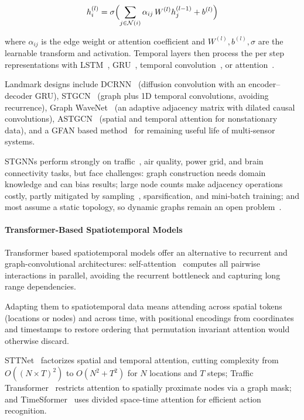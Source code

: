 \documentclass[journal]{IEEEtran}
\begin{document}
\begin{equation}
h_i^{(l)} = \sigma \Bigl( \sum_{j \in \mathcal{N}(i)} \alpha_{ij} \, W^{(l)} h_j^{(l-1)} + b^{(l)} \Bigr)
\end{equation}
 
where $\alpha_{ij}$ is the edge weight or attention coefficient and $W^{(l)},b^{(l)},\sigma$ are the learnable transform and activation. Temporal layers then process the per step representations with LSTM~\cite{rnn_lstm}, GRU~\cite{cho2014gru}, temporal convolution~\cite{lea2017temporal}, or attention~\cite{vaswani2017attention}.
 
Landmark designs include DCRNN~\cite{li2018dcrnn} (diffusion convolution with an encoder--decoder GRU), STGCN~\cite{yu2018spatio} (graph plus 1D temporal convolutions, avoiding recurrence), Graph WaveNet~\cite{wu2019graphwavenet} (an adaptive adjacency matrix with dilated causal convolutions), ASTGCN~\cite{guo2019astgcn} (spatial and temporal attention for nonstationary data), and a GFAN based method~\cite{wang2025rul} for remaining useful life of multi-sensor systems.
 
STGNNs perform strongly on traffic~\cite{yu2018spatio, li2018dcrnn}, air quality, power grid, and brain connectivity tasks, but face challenges: graph construction needs domain knowledge and can bias results; large node counts make adjacency operations costly, partly mitigated by sampling~\cite{hamilton2017inductive}, sparsification, and mini-batch training; and most assume a static topology, so dynamic graphs remain an open problem~\cite{pareja2020evolvegcn}.
 
\paragraph{Transformer-Based Spatiotemporal Models}
Transformer based spatiotemporal models offer an alternative to recurrent and graph-convolutional architectures: self-attention~\cite{vaswani2017attention} computes all pairwise interactions in parallel, avoiding the recurrent bottleneck and capturing long range dependencies.
 
Adapting them to spatiotemporal data means attending across spatial tokens (locations or nodes) and across time, with positional encodings from coordinates and timestamps to restore ordering that permutation invariant attention would otherwise discard.
 
STTNet~\cite{xu2020stransformer} factorizes spatial and temporal attention, cutting complexity from $O((N \times T)^2)$ to $O(N^2 + T^2)$ for $N$ locations and $T$ steps; Traffic Transformer~\cite{cai2020traffic} restricts attention to spatially proximate nodes via a graph mask; and TimeSformer~\cite{bertasius2021timesformer} uses divided space-time attention for efficient action recognition.
 
\end{document}
